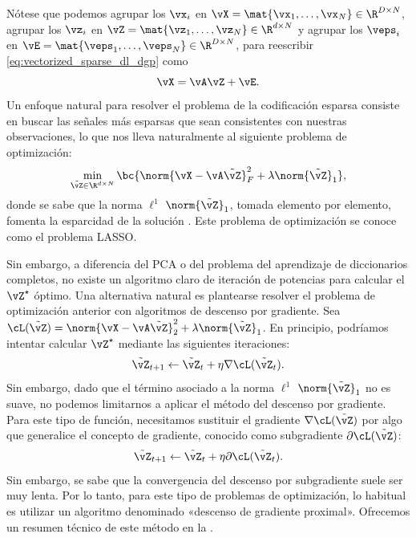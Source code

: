 \documentclass[../../book-main.tex]{subfiles}
\begin{document}
Nótese que podemos agrupar los \(\vx_{i}\) en \(\vX = \mat{\vx_{1},
\dots, \vx_{N}} \in \R^{D \times N}\), agrupar los \(\vz_{i}\) en
\(\vZ = \mat{\vz_{1}, \dots, \vz_{N}} \in \R^{d  \times N}\) y
agrupar los \(\veps_{i}\) en \(\vE = \mat{\veps_{1}, \dots,
\veps_{N}} \in \R^{D \times N}\), para reescribir
\eqref{eq:vectorized_sparse_dl_dgp} como
\begin{equation}\label{eq:sparse_dl_dgp}
    \vX = \vA\vZ + \vE.
\end{equation}
Un enfoque natural para resolver el problema de la codificación esparsa consiste en buscar las señales más esparsas
que sean consistentes con nuestras observaciones, lo que nos lleva naturalmente al
siguiente problema de optimización:
\begin{equation}\label{eq:sparse_dl_lasso}
    \min_{\tilde{\vZ} \in \R^{d \times N}}\bc{\norm{\vX -
        \vA\tilde{\vZ}}_{F}^{2} +
    \lambda \norm{\tilde{\vZ}}_{1}},
\end{equation}
donde se sabe que la norma \(\ell^1\) \(\norm{\tilde{\vZ}}_{1}\), tomada elemento por elemento,
fomenta la esparcidad de la solución \cite{Wright-Ma-2022}.
Este problema de optimización se conoce como el problema LASSO.

Sin embargo, a diferencia del PCA o del problema del aprendizaje de diccionarios completos, 
no existe un algoritmo claro de iteración de potencias
para calcular el \(\vZ^{\star}\) óptimo. Una alternativa natural es plantearse
resolver el problema de optimización anterior con algoritmos de descenso por gradiente.
Sea \(\cL(\tilde{\vZ}) = \norm{\vX - \vA\tilde{\vZ}}_{2}^{2} + \lambda
\norm{\tilde{\vZ}}_{1}\).
En principio, podríamos intentar calcular \(\vZ^{\star}\) mediante las siguientes
iteraciones:
\begin{equation}
    \tilde{\vZ}_{t+1} \leftarrow \tilde{\vZ}_t + \eta \nabla \cL(\tilde{\vZ}_t).
\end{equation}
Sin embargo, dado que el término asociado a la norma \(\ell^1\)
\(\norm{\tilde{\vZ}}_{1}\)
no es suave, no podemos limitarnos a aplicar el método del descenso por gradiente.
Para este tipo de función,
necesitamos sustituir el gradiente \(\nabla \cL(\tilde{\vZ})\) por algo que
generalice el concepto de gradiente, conocido como subgradiente \(\partial
\cL(\tilde{\vZ})\):
\begin{equation}
    \tilde{\vZ}_{t+1} \leftarrow \tilde{\vZ}_t + \eta \partial
    \cL(\tilde{\vZ}_t).
\end{equation}
Sin embargo, se sabe que la convergencia del descenso por subgradiente suele ser muy
lenta. Por lo tanto, para este tipo de problemas de optimización, lo habitual es utilizar
un algoritmo denominado «descenso de gradiente proximal». Ofrecemos un resumen técnico
de este método en la .
\end{document}
